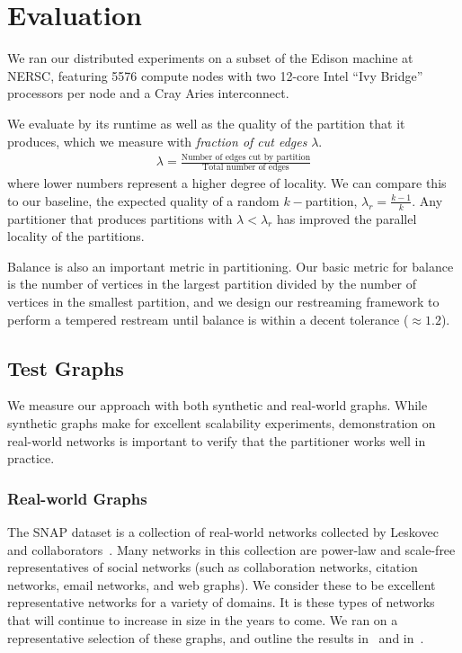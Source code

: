 \section{Evaluation}  \label{sec:eval}
We ran our distributed experiments on a subset of the Edison machine at NERSC, featuring 5576 compute nodes with two 12-core Intel ``Ivy Bridge'' processors per node and a Cray Aries interconnect. 

We evaluate \ourmethod by its runtime as well as the quality of the partition that it produces, which we measure with \textit{fraction of cut edges} $\lambda$.
\begin{align}\lambda = \frac{\text{Number of edges cut by partition}}{\text{Total number of edges}}\end{align} where lower numbers represent a higher degree of locality. We can compare this to our baseline, the expected quality of a random $k-$partition, $\lambda_r = \frac{k-1}{k}$. Any partitioner that produces partitions with $\lambda < \lambda_r$ has improved the parallel locality of the partitions.

Balance is also an important metric in partitioning. Our basic metric for balance is the number of vertices in the largest partition divided by the number of vertices in the smallest partition, and we design our restreaming framework to perform a tempered restream until balance is within a decent tolerance ($\approx 1.2$).

\subsection{Test Graphs}
We measure our approach with both synthetic and real-world graphs. While synthetic graphs make for excellent scalability experiments, demonstration on real-world networks is important to verify that the partitioner works well in practice. 

\subsubsection{Real-world Graphs}
The SNAP dataset is a collection of real-world networks collected by Leskovec and collaborators~\cite{Leskovec-data, snapnets}. 
Many networks in this collection are power-law and scale-free representatives of social networks (such as collaboration networks, citation networks, email networks, and web graphs). 
We consider these to be excellent representative networks for a variety of domains. It is these types of networks that will continue to increase in size in the years to come.
We ran \ourmethod on a representative selection of these graphs, and outline the results in~ and in~.

